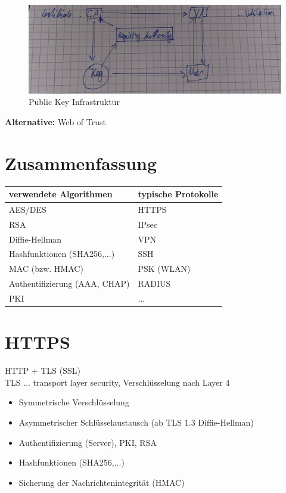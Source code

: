 \begin{figure}[H]
	\centering
	\includegraphics[width=0.7\linewidth]{figures/cert.jpeg}
	\caption{Public Key Infrastruktur}
\end{figure}

\textbf{Alternative:} Web of Trust \\

\section{Zusammenfassung}
\begin{tabular}{ | p{} | p{} |} \hline
	\textbf{verwendete Algorithmen} & \textbf{typische Protokolle} \\ \hline
	AES/DES & HTTPS \\
	RSA & IPsec \\
	Diffie-Hellman & VPN \\
	Hashfunktionen (SHA256,...) & SSH \\
	MAC (bzw. HMAC) & PSK (WLAN) \\
	Authentifizierung (AAA, CHAP) & RADIUS \\
	PKI & ... \\
	\hline
\end{tabular} 

\section{HTTPS} 
HTTP + TLS (SSL) \\
TLS ... transport layer security, Verschlüsselung nach Layer 4
\begin{itemize}
	\item Symmetrische Verschlüsselung
	\item Asymmetrischer Schlüsselaustausch (ab TLS 1.3 Diffie-Hellman)
	\item Authentifizierung (Server), PKI, RSA
	\item Hashfunktionen (SHA256,...)
	\item Sicherung der Nachrichtenintegrität (HMAC)
\end{itemize}

